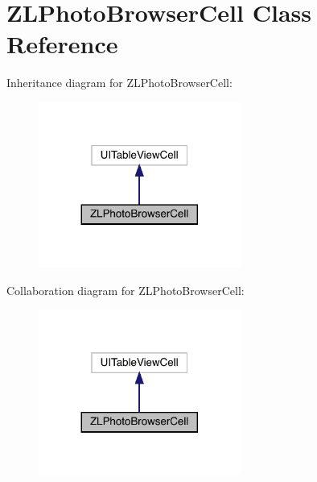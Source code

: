 \hypertarget{interface_z_l_photo_browser_cell}{}\section{Z\+L\+Photo\+Browser\+Cell Class Reference}
\label{interface_z_l_photo_browser_cell}


Inheritance diagram for Z\+L\+Photo\+Browser\+Cell\+:\nopagebreak
\begin{figure}[H]
\begin{center}
\leavevmode
\includegraphics[width=188pt]{interface_z_l_photo_browser_cell__inherit__graph}
\end{center}
\end{figure}


Collaboration diagram for Z\+L\+Photo\+Browser\+Cell\+:\nopagebreak
\begin{figure}[H]
\begin{center}
\leavevmode
\includegraphics[width=188pt]{interface_z_l_photo_browser_cell__coll__graph}
\end{center}
\end{figure}
